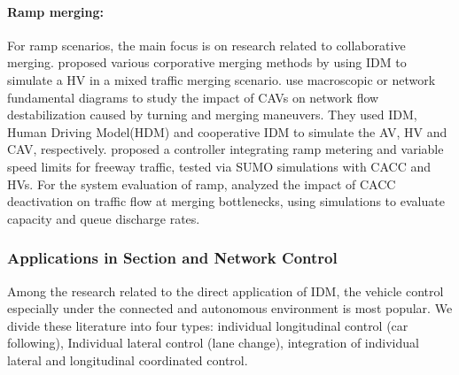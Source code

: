 \documentclass[a4paper,fleqn]{cas-sc}
\begin{document}
\paragraph{\textbf{Ramp merging:}}
For ramp scenarios, the main focus is on research related to collaborative merging. \cite{baselt_merging_2014,chen_deep_2023,hou_cooperative_2023,ito_coordination_2019,maProgressiveVirtualRiskBasedVehicle2024a,tangNovelHierarchicalCooperativeMerging2022b,xiongManagingMergingCAVLane2022b,zhou_state-constrained_2019} proposed various corporative merging methods by using IDM to simulate a HV in a mixed traffic merging scenario.\cite{guNetworkTrafficInstabilityAutomated2022b} use macroscopic or network fundamental diagrams  to study the impact of CAVs on network flow destabilization caused by turning and merging maneuvers. They used IDM, Human Driving Model(HDM) and cooperative IDM to simulate the AV, HV and CAV, respectively. \cite{silgu_combined_2022}  proposed a controller integrating ramp metering and variable speed limits for freeway traffic, tested via SUMO simulations with CACC and HVs.  For the system evaluation of ramp, \cite{xiaoUnravellingEffectsCooperativeAdaptive2018a} analyzed the impact of CACC deactivation on traffic flow at merging bottlenecks, using simulations to evaluate capacity and queue discharge rates.

\subsubsection{Applications in Section and Network  Control}

Among the research related to the direct application of IDM, the vehicle control especially under the connected and autonomous environment is most popular. We divide these literature into four types: individual longitudinal control (car following),
Individual lateral control (lane change), integration of individual lateral and longitudinal coordinated control.
\end{document}
